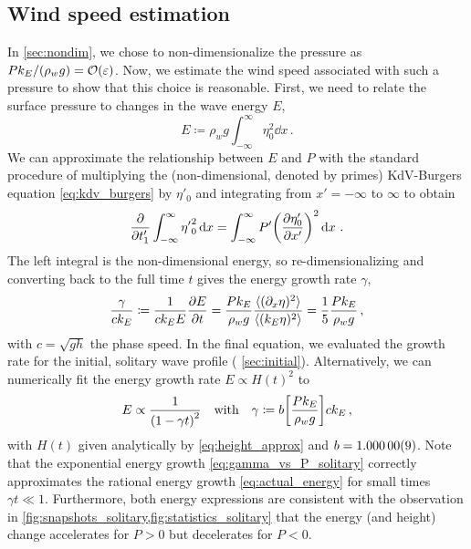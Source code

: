 \documentclass{jfm}
\renewcommand*{\epsilon}{\varepsilon}
\begin{document}
\subsection{\label{sec:press_mag} Wind speed estimation}
In \cref{sec:nondim}, we chose to non-dimensionalize the pressure as $P
k_E/(\rho_w g) = \order{\epsilon}$.
Now, we estimate the wind speed associated with such a pressure
to show that this choice is reasonable.
First, we need to relate the surface pressure to changes in the wave
energy $E$,
\begin{equation}
  E \coloneqq \rho_w g \int_{-\infty}^{\infty} {\eta}_0^2 \dd{x} \,.
\end{equation}
We can approximate the relationship between $E$ and $P$ with the
standard procedure \citep[\eg][]{mei2005nonlinear} of multiplying the
(non-dimensional, denoted by primes) KdV-Burgers equation
\cref{eq:kdv_burgers} by $\eta'_0$ and integrating from $x'=-\infty$ to
$\infty$ to obtain
\begin{equation}
  \pdv{t'_1} \int_{-\infty}^{\infty} {\eta'}_0^2 \dd{x}
  = \int_{-\infty}^{\infty} P' \pqty{\pdv{\eta'_0}{x'}}^2
  \dd{x} \,.
\end{equation}
The left integral is the non-dimensional energy, so re-dimensionalizing
and converting back to the full time $t$ gives the energy growth rate
$\gamma$,
\begin{equation}
  \frac{\gamma}{c k_E} \coloneqq
  \frac{1}{c k_E E} \pdv{E}{t}
  = \frac{P k_E}{\rho_w g} \frac{\langle (\partial_x \eta)^2 \rangle}
    {\langle (k_E \eta)^2 \rangle}
  = \frac{1}{5} \frac{P k_E}{\rho_w g}
  \,,
  \label{eq:gamma_vs_P_solitary}
\end{equation}
with $c = \sqrt{gh}$ the phase speed.
In the final equation, we evaluated the growth rate for the initial,
solitary wave profile (\cf{} \cref{sec:initial}).
Alternatively, we can numerically fit the energy growth rate
$E \propto H(t)^2$ to
\begin{equation}
  E \propto \frac{1}{\pqty{1 - \gamma t}^2}
  \qq{with}
  \gamma \coloneqq b \bqty{\frac{P k_E}{\rho_w g}} c k_E
  \,,
  \label{eq:actual_energy}
\end{equation}
with $H(t)$ given analytically by \cref{eq:height_approx} and $b =
\num{1.00000 \pm 0.00009}$.
Note that the exponential energy growth \cref{eq:gamma_vs_P_solitary}
correctly approximates the rational energy growth
\cref{eq:actual_energy} for small times $\gamma t \ll 1$.
Furthermore, both energy expressions are consistent with the observation
in \cref{fig:snapshots_solitary,fig:statistics_solitary} that the energy
(and height) change accelerates for $P>0$ but decelerates for $P<0$.
\end{document}
